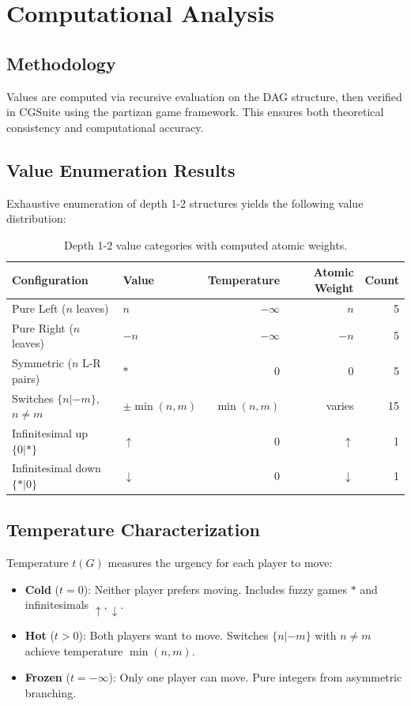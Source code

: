 \documentclass[10pt,a4paper,twocolumn]{article}
\theoremstyle{plain}
\theoremstyle{definition}
\theoremstyle{remark}
\begin{document}
\section{Computational Analysis}

\subsection{Methodology}

Values are computed via recursive evaluation on the DAG structure, then verified in CGSuite using the partizan game framework. This ensures both theoretical consistency and computational accuracy.

\subsection{Value Enumeration Results}

Exhaustive enumeration of depth 1-2 structures yields the following value distribution:

\begin{table}[ht]
\centering
\small
\begin{tabular}{@{}llrrr@{}}
\toprule
Configuration & Value & Temperature & Atomic Weight & Count \\
\midrule
Pure Left ($n$ leaves) & $n$ & $-\infty$ & $n$ & 5 \\
Pure Right ($n$ leaves) & $-n$ & $-\infty$ & $-n$ & 5 \\
Symmetric ($n$ L-R pairs) & $*$ & 0 & 0 & 5 \\
Switches $\{n|-m\}$, $n \neq m$ & $\pm\min(n,m)$ & $\min(n,m)$ & varies & 15 \\
Infinitesimal up $\{0|*\}$ & $\uparrow$ & 0 & $\uparrow$ & 1 \\
Infinitesimal down $\{*|0\}$ & $\downarrow$ & 0 & $\downarrow$ & 1 \\
\bottomrule
\end{tabular}
\caption{Depth 1-2 value categories with computed atomic weights.}
\end{table}

\subsection{Temperature Characterization}

Temperature $t(G)$ measures the urgency for each player to move:

\begin{itemize}
\item \textbf{Cold} ($t = 0$): Neither player prefers moving. Includes fuzzy games $*$ and infinitesimals $\uparrow, \downarrow$.
\item \textbf{Hot} ($t > 0$): Both players want to move. Switches $\{n|-m\}$ with $n \neq m$ achieve temperature $\min(n,m)$.
\item \textbf{Frozen} ($t = -\infty$): Only one player can move. Pure integers from asymmetric branching.
\end{itemize}
\end{document}
